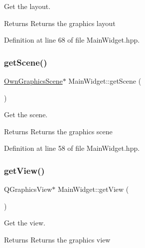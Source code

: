 Get the layout. 

\begin{DoxyReturn}{Returns}
Returns the graphics layout 
\end{DoxyReturn}


Definition at line 68 of file Main\+Widget.\+hpp.

\mbox{\label{classMainWidget_ad40a8bd13b501a0ebe88c87426a5b591}} 
\subsubsection{\texorpdfstring{get\+Scene()}{getScene()}}
{\footnotesize\ttfamily \mbox{\hyperlink{classOwnGraphicsScene}{Own\+Graphics\+Scene}}$\ast$ Main\+Widget\+::get\+Scene (\begin{DoxyParamCaption}{ }\end{DoxyParamCaption})\hspace{0.3cm}{\ttfamily [inline]}}



Get the scene. 

\begin{DoxyReturn}{Returns}
Returns the graphics scene 
\end{DoxyReturn}


Definition at line 58 of file Main\+Widget.\+hpp.

\mbox{\label{classMainWidget_ae73e3dac6fb1e99dabe84aab683b3fbd}} 
\subsubsection{\texorpdfstring{get\+View()}{getView()}}
{\footnotesize\ttfamily Q\+Graphics\+View$\ast$ Main\+Widget\+::get\+View (\begin{DoxyParamCaption}{ }\end{DoxyParamCaption})\hspace{0.3cm}{\ttfamily [inline]}}



Get the view. 

\begin{DoxyReturn}{Returns}
Returns the graphics view 
\end{DoxyReturn}


